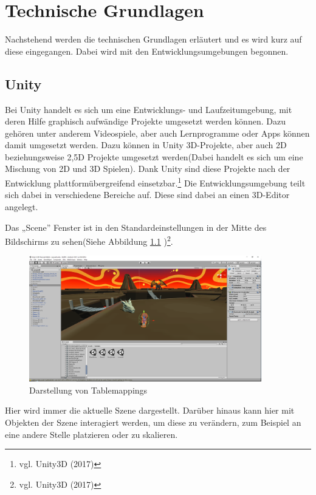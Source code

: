 \chapter{Technische Grundlagen}
	Nachstehend werden die technischen Grundlagen erläutert und es wird kurz auf diese eingegangen. Dabei wird mit den Entwicklungsumgebungen begonnen.

\section{Unity}
Bei Unity handelt es sich um eine Entwicklungs- und Laufzeitumgebung, mit deren Hilfe graphisch aufwändige Projekte umgesetzt werden können. Dazu gehören unter anderem Videospiele, aber auch Lernprogramme oder Apps können damit umgesetzt werden. Dazu können in Unity 3D-Projekte, aber auch 2D beziehungsweise 2,5D Projekte umgesetzt werden(Dabei handelt es sich um eine Mischung von 2D und 3D Spielen). Dank Unity sind diese Projekte nach der Entwicklung plattformübergreifend einsetzbar.\footnote{vgl. Unity3D \cite{unity1} (2017)} Die Entwicklungsumgebung teilt sich dabei in verschiedene Bereiche auf. Diese sind dabei an einen 3D-Editor angelegt.

Das „Scene” Fenster ist in den Standardeinstellungen in der Mitte des Bildschirms zu sehen(Siehe Abbildung \ref{scene} )\footnote{vgl. Unity3D \cite{unity2} (2017)}.

\begin{figure}[htbp]
\centering 
\label{scene}
\includegraphics[width=0.9\textwidth]{pics/unity3d_ui.png}
\caption{Darstellung von Tablemappings}
\end{figure}

Hier wird immer die aktuelle Szene dargestellt. Darüber hinaus kann hier mit Objekten der Szene interagiert werden, um diese zu verändern, zum Beispiel an eine andere Stelle platzieren oder zu skalieren.

